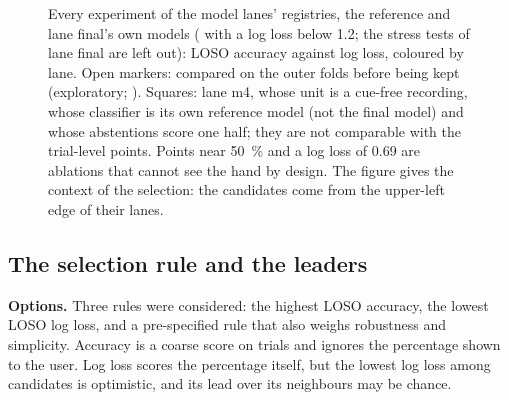 \begin{figure}[htbp]
  \centering
  \caption{Every experiment of the model lanes' registries, the reference and lane final's own models ( with a log loss below 1.2; the stress tests of lane final are left out): LOSO accuracy against log loss, coloured by lane.
    Open markers: compared on the outer folds before being kept (exploratory; ).
    Squares: lane m4, whose unit is a cue-free recording, whose classifier is its own reference model (not the final model) and whose abstentions score one half; they are not comparable with the trial-level points.
    Points near 50~\% and a log loss of 0.69 are ablations that cannot see the hand by design.
    The figure gives the context of the selection: the candidates come from the upper-left edge of their lanes.}
  \label{fig:FINAL_02_overview}\label{fig:app:final-overview}
\end{figure}


\subsection{The selection rule and the leaders}\label{app:final:rule}

\textbf{Options.}
Three rules were considered: the highest LOSO accuracy, the lowest LOSO log loss, and a pre-specified rule that also weighs robustness and simplicity.
Accuracy is a coarse score on  trials and ignores the percentage shown to the user.
Log loss scores the percentage itself, but the lowest log loss among  candidates is optimistic, and its lead over its neighbours may be chance.


